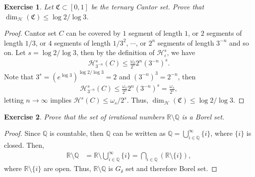 \documentclass[11pt]{book}
\newtheorem{exercise}{Exercise}[chapter]
\theoremstyle{definition}
\numberwithin{equation}{chapter}
\def\CC{\mathfrak{C}}
\def\H{{\mathcal H}}
\begin{document}
\begin{exercise}
Let $\CC \subset [0,1]$ be the ternary Cantor set. Prove that $\dim_{\H}(\CC) \leq \log 2/\log 3$.
\end{exercise}
\begin{proof}
Cantor set $C$ can be covered by $1$ segment of length $1$, or $2$ segments of length $1/3$, or $4$ segments of length $1/3^2$, $\cdots$, or $2^n$ segments of length $3^{-n}$ and so on. Let $s = \log 2/\log 3$, then by the definition of $\H^s_{\varepsilon}$, we have
\begin{align*}
    \H^s_{3^{-n}}(C) \leq \frac{\omega_s}{2^s} 2^n \left(3^{-n}\right)^s.
\end{align*}
Note that $3^s = \left(e^{\log 3}\right)^{\log 2/\log 3} = 2$ and $\left(3^{-n}\right)^3 = 2^{-n}$, then 
\begin{align*}
    \H^s_{3^{-n}}(C) \leq \frac{\omega_s}{2^s} 2^n \left(3^{-n}\right)^s = \frac{\omega_s}{2^s},
\end{align*}
letting $n \to \infty$ implies $\H^s(C) \leq \omega_s / 2^s$. Thus, $\dim_{\H}(\CC) \leq \log 2/\log 3$.
\end{proof}

\medskip

\begin{exercise}
Prove that the set of irrational numbers $\mathbb{R} \setminus \mathbb{Q}$ is a Borel set.
\end{exercise}
\begin{proof}
Since $\mathbb{Q}$ is countable, then $\mathbb{Q}$ can be written as $\mathbb{Q} = \bigcup^\infty_{i \in \mathbb{Q}}\{i\}$, where $\{i\}$ is closed. Then,
\begin{align*}
    \mathbb{R} \setminus \mathbb{Q} & = \mathbb{R} \setminus \bigcup^\infty_{i \in \mathbb{Q}}\{i\} = \bigcap_{i \in \mathbb{Q}} \left(\mathbb{R} \setminus \{i\} \right),
\end{align*}
where $\mathbb{R} \setminus \{i\}$ are open. Thus, $\mathbb{R} \setminus \mathbb{Q}$ is $G_\delta$ set and therefore Borel set.
\end{proof}

\medskip
\end{document}
